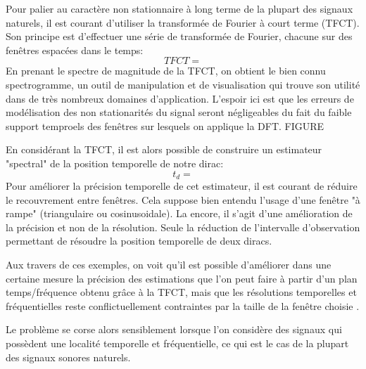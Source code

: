 Pour palier au caractère non stationnaire à long terme de la plupart des signaux naturels, il est courant d'utiliser la transformée de Fourier à court terme (TFCT). Son principe est d'effectuer une série de transformée de Fourier, chacune sur des fenêtres espacées dans le temps:
\begin{equation}
TFCT =
\end{equation}
En prenant le spectre de magnitude de la TFCT, on obtient le bien connu spectrogramme, un outil de manipulation et de visualisation qui trouve son utilité dans de très nombreux domaines d'application. L'espoir ici est que les erreurs de modélisation des non stationarités du signal seront négligeables du fait du faible support temproels des fenêtres sur lesquels on applique la DFT.  FIGURE

En considérant la TFCT, il est alors possible de construire un estimateur "spectral" de la position temporelle de notre dirac:
\begin{equation}
t_d =
\end{equation}
Pour améliorer la précision temporelle de cet estimateur, il est courant de réduire le recouvrement entre fenêtres. Cela suppose bien entendu l'usage d'une fenêtre "à rampe" (triangulaire ou cosinusoidale). La encore, il s'agit d'une amélioration de la précision et non de la résolution. Seule la réduction de l'intervalle d'observation permettant de résoudre la position temporelle de deux diracs.

Aux travers de ces exemples, on voit qu'il est possible d'améliorer dans une certaine mesure la précision des estimations que l'on peut faire à partir d'un plan temps/fréquence obtenu grâce à la TFCT, mais que les résolutions temporelles et fréquentielles reste conflictuellement contraintes par la taille de la fenêtre choisie .

Le problème se corse alors sensiblement lorsque l'on considère des signaux qui possèdent une localité temporelle et fréquentielle, ce qui est le cas de la plupart des signaux sonores naturels.

